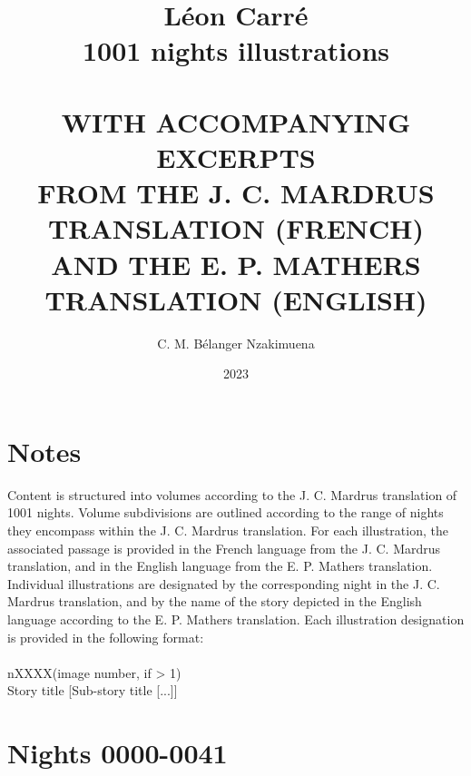 \documentclass[a4paper,12pt,]{book}
\newcommand\tab[1][1cm]{\hspace*{#1}}
\begin{document}
\title{ 
	\Huge{\textbf{Léon Carré \protect\\ 1001 nights illustrations}} \\~\\
	\small{\uppercase{with accompanying excerpts \protect\\ from the J. C. Mardrus translation (French) \protect\\ and the E. P. Mathers translation (English)}}
} %
\author{C. M. Bélanger Nzakimuena}
\date{2023} %
\maketitle

\setlength\parindent{0pt} %
\let\cleardoublepage\clearpage %

\frontmatter
\tableofcontents %
\setcounter{page}{2} %

\chapter*{Notes}
Content is structured into volumes according to the J. C. Mardrus translation of 1001 nights.  Volume subdivisions are outlined according to the range of nights they encompass within the J. C. Mardrus translation.  For each illustration, the associated passage is provided in the French language from the J. C. Mardrus translation, and in the English language from the E. P. Mathers translation.  Individual illustrations are designated by the corresponding night in the J. C. Mardrus translation, and by the name of the story depicted in the English language according to the E. P. Mathers translation.  Each illustration designation is provided in the following format: \\~\\
\tab\tab\tab\tab nXXXX(\textquotesingle image number\textquotesingle, if > 1)\\
\tab\tab\tab\tab Story title [Sub-story title [...]]

\mainmatter

\chapter{Nights 0000-0041}
\newpage

\end{document}
